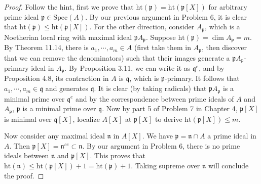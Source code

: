 \documentclass{solution}
\begin{document}
\begin{proof}
    Follow the hint, first we prove that $\mathrm{ht}(\mathfrak{p}) = \mathrm{ht}(\mathfrak{p}[X])$ for arbitrary prime ideal $\mathfrak{p} \in \mathrm{Spec}(A)$. By our previous argument in Problem 6, it is clear that $\mathrm{ht}(\mathfrak{p}) \le \mathrm{ht}(\mathfrak{p}[X])$. For the other direction, consider $A_{\mathfrak{p}}$, which is a Noetherian local ring with maximal ideal $\mathfrak{p} A_{\mathfrak{p}}$. Suppose $\mathrm{ht}(\mathfrak{p}) = \dim A_{\mathfrak{p}} = m$. By Theorem 11.14, there is $a_1, \cdots, a_m \in A$ (first take them in $A_{\mathfrak{p}}$, then discover that we can remove the denominators) such that their images generate a $\mathfrak{p} A_{\mathfrak{p}}$-primary ideal in $A_{\mathfrak{p}}$. By Proposition 3.11, we can write it as $\mathfrak{q}^e$, and by Proposition 4.8, its contraction in $A$ is $\mathfrak{q}$, which is $\mathfrak{p}$-primary. It follows that $a_1, \cdots, a_m \in \mathfrak{q}$ and generates $\mathfrak{q}$. It is clear (by taking radicals) that $\mathfrak{p} A_{\mathfrak{p}}$ is a minimal prime over $\mathfrak{q}^e$ and by the correspondence between prime ideals of $A$ and $A_{\mathfrak{p}}$, $\mathfrak{p}$ is a minimal prime over $\mathfrak{q}$. Now by part 5 of Problem 7 in Chapter 4, $\mathfrak{p}[X]$ is minimal over $\mathfrak{q}[X]$, localize $A[X]$ at $\mathfrak{p}[X]$ to derive $\mathrm{ht}(\mathfrak{p}[X]) \le m$.

    Now consider any maximal ideal $\mathfrak{n}$ in $A[X]$. We have $\mathfrak{p} = \mathfrak{n} \cap A$ a prime ideal in $A$. Then $\mathfrak{p}[X] = \mathfrak{n}^{ce} \subset \mathfrak{n}$. By our argument in Problem 6, there is no prime ideals between $\mathfrak{n}$ and $\mathfrak{p}[X]$. This proves that $\mathrm{ht}(\mathfrak{n}) \le \mathrm{ht}(\mathfrak{p}[X]) + 1 = \mathrm{ht}(\mathfrak{p}) + 1$. Taking supreme over $\mathfrak{n}$ will conclude the proof.
\end{proof}
\end{document}
